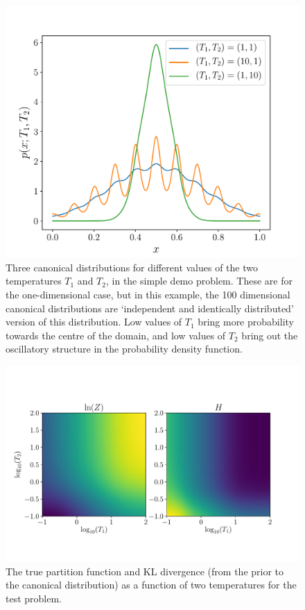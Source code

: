 \documentclass[entropy,article,submit,moreauthors,pdftex,10pt,a4paper]{Definitions/mdpi}
\begin{document}
\begin{figure}[!ht]
\centering
\includegraphics[scale=0.6]{figures/demo_canonical.pdf}
\caption{Three canonical distributions for different values of the two
temperatures $T_1$ and $T_2$, in the simple demo problem.
These are for the one-dimensional case, but
in this example, the 100 dimensional canonical distributions are `independent
and identically distributed' version of this distribution.
Low values of $T_1$ bring
more probability towards the centre of the domain, and low values of $T_2$
bring out the oscillatory structure in the probability density function.
\label{fig:demo_canonical}}
\end{figure}

\begin{figure}[!ht]
\centering
\includegraphics[scale=0.6]{figures/demo_truth.pdf}
\caption{The true partition function and KL divergence (from the prior to
the canonical distribution) as a function of two temperatures for the
test problem.\label{fig:demo_truth}}
\end{figure}
\end{document}
